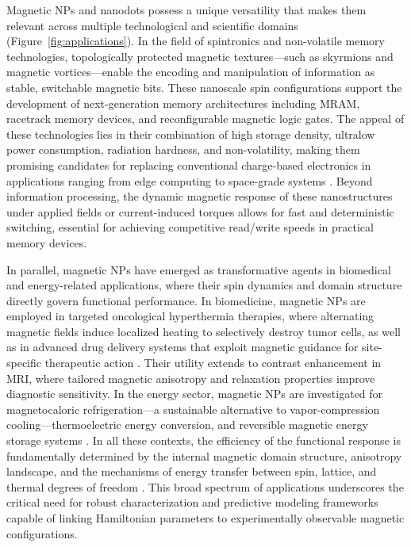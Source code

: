 \documentclass[letterpaper, 12, one column]{article}
\begin{document}
Magnetic NPs and nanodots possess a unique versatility that makes them relevant across multiple technological and scientific domains (Figure~\ref{fig:applications}). In the field of spintronics and non-volatile memory technologies, topologically protected magnetic textures—such as skyrmions and magnetic vortices—enable the encoding and manipulation of information as stable, switchable magnetic bits. These nanoscale spin configurations support the development of next-generation memory architectures including MRAM, racetrack memory devices, and reconfigurable magnetic logic gates. The appeal of these technologies lies in their combination of high storage density, ultralow power consumption, radiation hardness, and non-volatility, making them promising candidates for replacing conventional charge-based electronics in applications ranging from edge computing to space-grade systems \cite{Eurek2024}. Beyond information processing, the dynamic magnetic response of these nanostructures under applied fields or current-induced torques allows for fast and deterministic switching, essential for achieving competitive read/write speeds in practical memory devices.

In parallel, magnetic NPs have emerged as transformative agents in biomedical and energy-related applications, where their spin dynamics and domain structure directly govern functional performance. In biomedicine, magnetic NPs are employed in targeted oncological hyperthermia therapies, where alternating magnetic fields induce localized heating to selectively destroy tumor cells, as well as in advanced drug delivery systems that exploit magnetic guidance for site-specific therapeutic action \cite{MLDesign2023}. Their utility extends to contrast enhancement in MRI, where tailored magnetic anisotropy and relaxation properties improve diagnostic sensitivity. In the energy sector, magnetic NPs are investigated for magnetocaloric refrigeration—a sustainable alternative to vapor-compression cooling—thermoelectric energy conversion, and reversible magnetic energy storage systems \cite{He2025}. In all these contexts, the efficiency of the functional response is fundamentally determined by the internal magnetic domain structure, anisotropy landscape, and the mechanisms of energy transfer between spin, lattice, and thermal degrees of freedom \cite{Nehan2024}. This broad spectrum of applications underscores the critical need for robust characterization and predictive modeling frameworks capable of linking Hamiltonian parameters to experimentally observable magnetic configurations.
\end{document}
